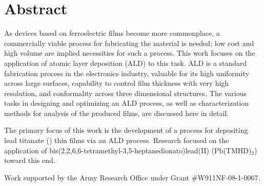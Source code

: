 \newpage
\chapter*{Abstract}


\noindent As devices based on ferroelectric films become more commonplace, a commercially viable process for fabricating the material is needed; low cost and high volume are implied necessities for such a process. This work focuses on the application of atomic layer deposition (ALD) to this task. ALD is a standard fabrication process in the electronics industry, valuable for its high uniformity across large surfaces, capability to control film thickness with very high resolution, and conformality across three dimensional structures. The various tasks in designing and optimizing an ALD process, as well as characterization methods for analysis of the produced films, are discussed here in detail.

The primary focus of this work is the development of a process for depositing lead titanate () thin films via an ALD process. Research focused on the application of bis(2,2,6,6-tetramethyl-3,5-heptanedionato)lead(II) (Pb(TMHD)$_{2}$) toward this end. 

Work supported by the Army Research Office under Grant \#W911NF-08-1-0067.